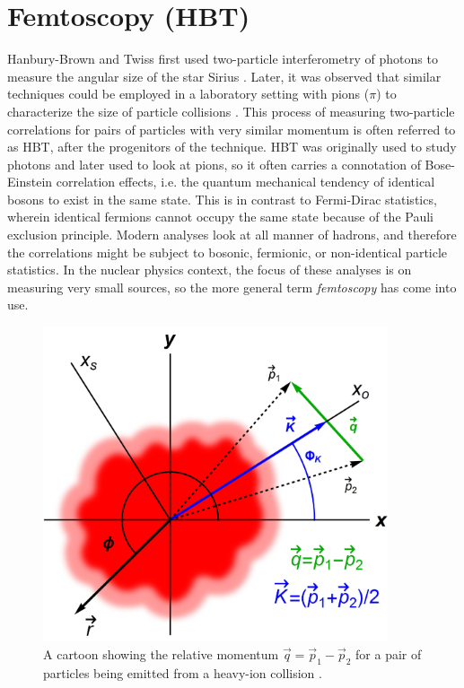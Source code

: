 \section{Femtoscopy (HBT)}
\label{sec:FemtoHBT}
Hanbury-Brown and Twiss first used two-particle interferometry of photons to measure the angular size of the star Sirius \cite{HanburyBrown:1956bqd}.
Later, it was observed that similar techniques could be employed in a laboratory setting with pions ($\pi$) to characterize the size of particle collisions \cite{Goldhaber:1960sf}.
This process of measuring two-particle correlations for pairs of particles with very similar momentum is often referred to as HBT, after the progenitors of the technique.
HBT was originally used to study photons and later used to look at pions, so it often carries a connotation of Bose-Einstein correlation effects, i.e. the quantum mechanical tendency of identical bosons to exist in the same state. This is in contrast to Fermi-Dirac statistics, wherein identical fermions cannot occupy the same state because of the Pauli exclusion principle.
Modern analyses look at all manner of hadrons, and therefore the correlations might be subject to bosonic, fermionic, or non-identical particle statistics.
In the nuclear physics context, the focus of these analyses is on measuring very small sources, so the more general term \textit{femtoscopy} has come into use.

\begin{figure}[hbt]
\includegraphics[width=24pc]{Figures/BorrowedFigures/QandK.jpg}
\caption[Relative momentum]{A cartoon showing the relative momentum $\vec{q} = \vec{p}_1 - \vec{p}_2$ for a pair of particles being emitted from a heavy-ion collision \cite{Plumberg:2016sig}.}
\label{fig:QandK}
\end{figure}

